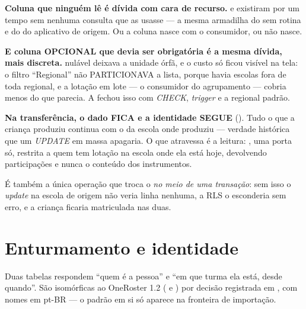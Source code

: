 \begin{atencao}
\textbf{Coluna que ninguém lê é dívida com cara de recurso.}  e
 existiram por um tempo sem nenhuma consulta que as usasse ---
a mesma armadilha do  sem rotina e do
 do aplicativo de origem. Ou a coluna nasce com o
consumidor, ou não nasce.

\medskip
\textbf{E coluna OPCIONAL que devia ser obrigatória é a mesma dívida, mais
discreta.}  nulável deixava a unidade órfã, e o custo só ficou
visível na tela: o filtro \enquote{Regional} não PARTICIONAVA a lista, porque
havia escolas fora de toda regional, e a lotação em lote --- o consumidor do
agrupamento --- cobria menos do que parecia. A  fechou isso com
\emph{CHECK}, \emph{trigger} e a regional padrão.
\end{atencao}

\begin{decisao}
\textbf{Na transferência, o dado FICA e a identidade SEGUE} (). Tudo
o que a criança produziu continua com o  da escola onde produziu ---
verdade histórica que um \emph{UPDATE} em massa apagaria. O que atravessa é a
leitura: , uma porta só, restrita a quem tem
lotação na escola onde ela está hoje, devolvendo participações e nunca o conteúdo
dos instrumentos.

É também a única operação que troca o  \emph{no meio de uma
transação}: sem isso o \emph{update} na escola de origem não veria linha nenhuma,
a RLS o esconderia sem erro, e a criança ficaria matriculada nas duas.
\end{decisao}

\section{Enturmamento e identidade}
\label{sec:enturmamento}

Duas tabelas respondem \enquote{quem é a pessoa} e \enquote{em que turma ela está,
desde quando}. São isomórficas ao OneRoster 1.2 ( e
) por decisão registrada em , com nomes em pt-BR ---
o padrão em si só aparece na fronteira de importação.

